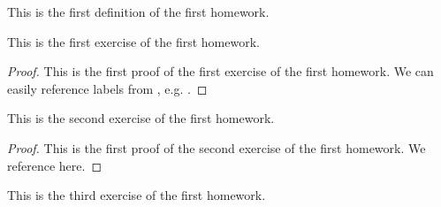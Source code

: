 \begin{definition}
    This is the first definition of the first homework.
\end{definition}
\begin{exercise}\label{ex:H.1.1}
    This is the first exercise of the first homework.
\end{exercise}
\begin{proof}
    This is the first proof of the first exercise of the first homework. We can easily reference labels from , e.g. .
\end{proof}

\begin{exercise}\label{ex:H.1.2}
    This is the second exercise of the first homework.
\end{exercise}
\begin{proof}
    This is the first proof of the second exercise of the first homework. We reference  here.
\end{proof}

\begin{exercise}\label{ex:H.1.3}
    This is the third exercise of the first homework.
\end{exercise}